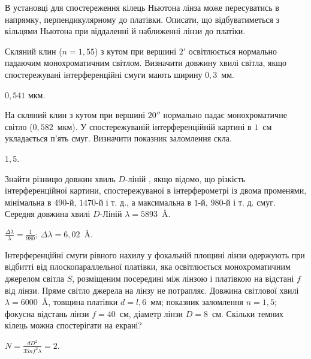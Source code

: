 \begin{problem}%
В установці для спостереження кілець Ньютона лінза може
пересуватись в напрямку, перпендикулярному до платівки. Описати,
що відбуватиметься з кільцями Ньютона при віддаленні й наближенні
лінзи до платіки.
\end{problem}


\begin{problem}%
Скляний клин ($ n = 1,55 $) з кутом при вершині $ 2' $ освітлюється
нормально падаючим монохроматичним світлом. Визначити довжину
хвилі світла, якщо спостережувані інтерференційні смуги мають
ширину $ 0,3 $~мм.
\begin{solution}
	$ 0,541 $ мкм.
\end{solution}
\end{problem}


\begin{problem}%
На скляний клин з кутом при вершині $ 20'' $ нормально падає
монохроматичне світло ($ 0,582 $~мкм). У спостережуваній
інтерференційній картині в $ 1 $~см укладається п'ять смуг. Визначити
показник заломлення скла.
\begin{solution}
	$ 1,5 $.
\end{solution}
\end{problem}


\begin{problem}%
Знайти різницю довжин хвиль $D$-ліній , якщо відомо, що різкість
інтерференційної картини, спостережуваної в інтерферометрі із двома
променями, мінімальна в $ 490 $-й, $ 1470 $-й і т. д., а максимальна в $ 1 $-й, $ 980 $-й
і т. д. смуг. Середня довжина хвилі $D$-Ліній $ \lambda = 5893$~\AA.
\begin{solution}
	$\frac{\Delta\lambda}{\lambda} = \frac1{980}$; $\Delta\lambda = 6,02$~\AA.
\end{solution}
\end{problem}



\begin{problem}%
Інтерференційні смуги рівного нахилу у фокальній площині лінзи
одержують при відбитті від плоскопараллельної платівки, яка
освітлюється монохроматичним джерелом світла $S$, розміщеним
посередині між лінзою і платівкою на відстані $f$ від лінзи. Пряме
світло джерела на лінзу не потрапляє. Довжина світлової хвилі $ \lambda = 6000 $~\AA,
товщина платівки $ d = l,6 $~мм; показник заломлення $ n = 1,5 $; фокусна
відстань лінзи $ f = 40 $~см, діаметр лінзи $ D = 8 $~см. Скільки темних кілець
можна спостерігати на екрані?
\begin{solution}
	$N = \frac{dD^2}{35nf^2\lambda} = 2$.
\end{solution}
\end{problem}



